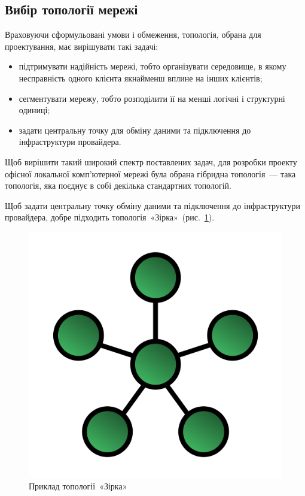 \documentclass[
  ukrainian,
  simple,
  floatsection,
]{eskdnaukvd}
\newlength{\gridunitwidth}
\begin{document}
    \subsection{Вибір топології мережі}

      Враховуючи сформульовані умови і обмеження, топологія, обрана для проектування, має вирішувати такі задачі:
      \begin{itemize}
        \item підтримувати надійність мережі, тобто організувати середовище, в якому несправність одного клієнта якнайменш вплине на інших клієнтів;
        \item сегментувати мережу, тобто розподілити її на менші логічні і структурні одиниці;
        \item задати центральну точку для обміну даними та підключення до інфраструктури провайдера.
      \end{itemize}
      Щоб вирішити такий широкий спектр поставлених задач, для розробки проекту офісної локальної комп'\-ю\-тер\-ної мережі була обрана гібридна топологія~— така топологія, яка поєднує в собі декілька стандартних топологій.

      Щоб задати центральну точку обміну даними та підключення до інфраструктури провайдера, добре підходить топологія~«Зірка»~(рис.~\ref{fig:topology-star}).

      \begin{figure}[!htbp]
        \centering
        \includegraphics[width = 4 \gridunitwidth]{./assets/02-topology-star.png}
        \caption{Приклад топології~«Зірка»}
        \label{fig:topology-star}
      \end{figure}
\end{document}
